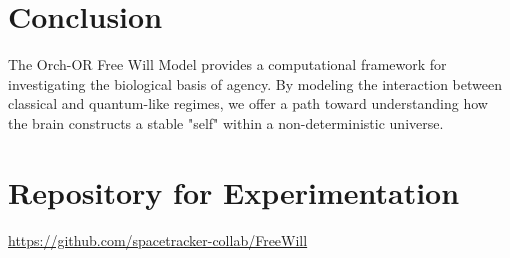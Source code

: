 \documentclass[12pt]{article}
\begin{document}
\section{Conclusion}
The Orch-OR Free Will Model provides a computational framework for investigating the biological basis of agency. By modeling the interaction between classical and quantum-like regimes, we offer a path toward understanding how the brain constructs a stable "self" within a non-deterministic universe.

\section{Repository for Experimentation}
\noindent
\url{https://github.com/spacetracker-collab/FreeWill}
\end{document}
